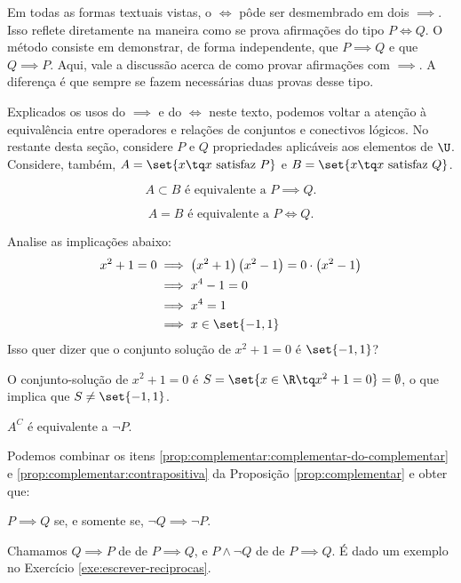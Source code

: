 Em todas as formas textuais vistas, o $\iff$ pôde ser desmembrado em dois $\implies$.
Isso reflete diretamente na maneira como se prova afirmações do tipo $P \iff Q$.
O método consiste em demonstrar, de forma independente, que $P \implies Q$ e que $Q \implies P$.
Aqui, vale a discussão acerca de como provar afirmações com $\implies$.
A diferença é que sempre se fazem necessárias duas provas desse tipo.

Explicados os usos do $\implies$  e do $\iff$ neste texto, podemos voltar a atenção à equivalência entre operadores e relações de conjuntos e conectivos lógicos.
No restante desta seção, considere $P$ e $Q$ propriedades aplicáveis aos elementos de $\U$.
Considere, também, $A = \set {x \tq x \text{ satisfaz } P}$ e $B= \set {x \tq x \text{ satisfaz } Q}$.

\begin{equivalence} 
$$ A \subset B \text{ é equivalente a } P \implies Q \text{.} $$
\end{equivalence}

\begin{equivalence} 
$$ A = B \text{ é equivalente a } P \iff Q \text{.} $$
\end{equivalence}

\begin{example}
Analise as implicações abaixo:
\begin{equation*}
\begin{aligned}
x^2+1=0 & \implies \left(x^2 +1 \right) \left( x^2-1 \right) = 0
\cdot \left( x^2-1 \right) \\
& \implies x^4 - 1 = 0 \\
& \implies x^4 = 1 \\
& \implies x \in \set {-1, 1}
\end{aligned}
\end{equation*}
%
Isso quer dizer que o conjunto solução de $x^2 +1 = 0$ é $\set{-1, 1}$?
\end{example}

\begin{solution}
O conjunto-solução de $x^2 + 1 = 0$ é $S = \set{x \in \R \tq x^2 + 1 = 0} = \emptyset$, o que implica que $S \ne \set{-1,1}$.
\end{solution}

\begin{equivalence} 
$A^C$ é equivalente a $\neg P$.
\end{equivalence}
Podemos combinar os itens \ref{prop:complementar:complementar-do-complementar} e \ref{prop:complementar:contrapositiva} da Proposição \ref{prop:complementar} e obter que:
\begin{center}
    $P \implies Q$ se, e somente se, $\neg Q \implies \neg P$.
\end{center}
Chamamos $Q \implies P$ de  de $P \implies Q$, e $P \land \neg Q$ de \newline de $P \implies Q$. É dado um exemplo no Exercício \ref{exe:escrever-reciprocas}.

